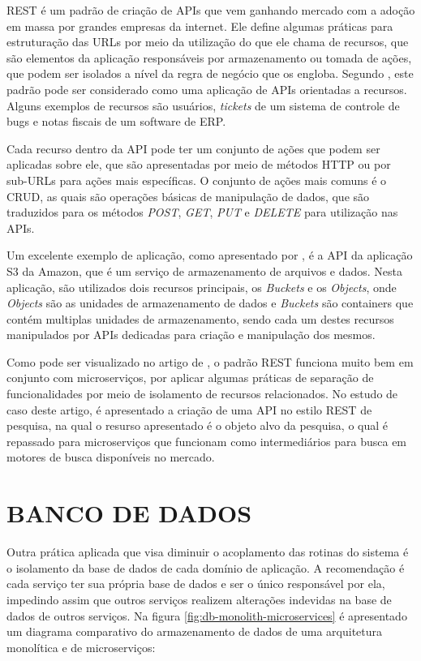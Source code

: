 \ac{REST} é um padrão de criação de \acp{API} que vem ganhando mercado com a
adoção em massa por grandes empresas da internet. Ele define algumas práticas
para estruturação das \acp{URL} por meio da utilização do que ele chama de
recursos, que são elementos da aplicação responsáveis por armazenamento ou
tomada de ações, que podem ser isolados a nível da regra de negócio que os
engloba. Segundo , este padrão pode ser considerado
como uma aplicação de \acp{API} orientadas a recursos. Alguns exemplos
de recursos são usuários, \emph{tickets} de um sistema de controle de bugs e
notas fiscais de um software de \ac{ERP}.

Cada recurso dentro da \ac{API} pode ter um conjunto de ações que podem ser
aplicadas sobre ele, que são apresentadas por meio de métodos \ac{HTTP} ou
por sub-\acp{URL} para ações mais específicas. O conjunto de ações mais
comuns é o \ac{CRUD}, as quais são operações básicas de manipulação de dados,
que são traduzidos para os métodos \emph{POST}, \emph{GET}, \emph{PUT} e
\emph{DELETE} para utilização nas \acp{API}.

Um excelente exemplo de aplicação, como apresentado por
, é a \ac{API} da aplicação S3 da Amazon, que é
um serviço de armazenamento de arquivos e dados. Nesta aplicação, são
utilizados dois recursos principais, os \emph{Buckets} e os \emph{Objects},
onde \emph{Objects} são as unidades de armazenamento de dados e \emph{Buckets}
são containers que contém multiplas unidades de armazenamento, sendo cada
um destes recursos manipulados por \acp{API} dedicadas para criação e
manipulação dos mesmos.

Como pode ser visualizado no artigo de  , o padrão
\ac{REST} funciona muito bem em conjunto com microserviços, por aplicar algumas
práticas de separação de funcionalidades por meio de isolamento de recursos
relacionados. No estudo de caso deste artigo, é apresentado a criação de uma
\ac{API} no estilo \ac{REST} de pesquisa, na qual o resurso apresentado é o
objeto alvo da pesquisa, o qual é repassado para microserviços que funcionam
como intermediários para busca em motores de busca disponíveis no mercado.

\section{BANCO DE DADOS}

Outra prática aplicada que visa diminuir o acoplamento das rotinas do sistema
é o isolamento da base de dados de cada domínio de aplicação. A recomendação é
cada serviço ter sua própria base de dados e ser o único responsável por ela,
impedindo assim que outros serviços realizem alterações indevidas na base de
dados de outros serviços. Na figura \ref{fig:db-monolith-microservices}
é apresentado um diagrama comparativo do armazenamento de dados de uma
arquitetura monolítica e de microserviços:

